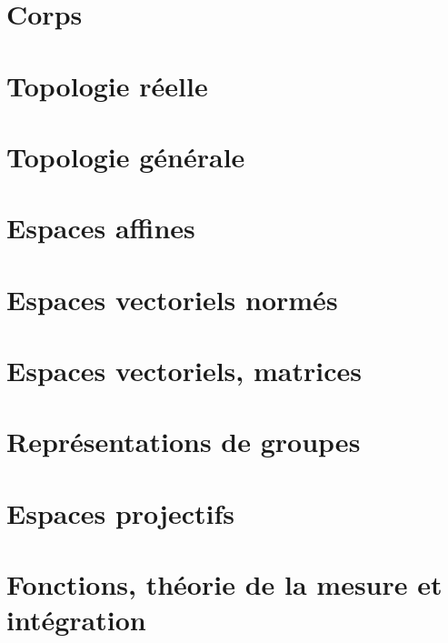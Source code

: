 \chapter{Corps}




\chapter{Topologie réelle}


\chapter{Topologie générale}


\chapter{Espaces affines}


\chapter{Espaces vectoriels normés}


\chapter{Espaces vectoriels, matrices}






\chapter{Représentations de groupes}


\chapter{Espaces projectifs}


\chapter{Fonctions, théorie de la mesure et intégration}









